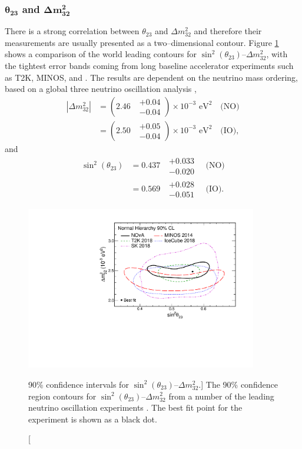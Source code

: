 \subsubsection*{$\boldsymbol{\theta_{23}}$ and $\boldsymbol{\Delta m^2_{32}}$}

There is a strong correlation between $\theta_{23}$ and $\Delta m^2_{32}$ and
therefore their measurements are usually presented as a two--dimensional
contour. Figure \ref{fig:delm_sin23} shows a comparison of the world leading
contours for $\sin^2 (\theta_{23})$--$\Delta m^2_{32}$, with the tightest error
bands coming from long baseline accelerator experiments such as T2K, MINOS, and 
\nova{} \cite{PhysRevD.96.092006, PhysRevLett.112.191801,
PhysRevLett.123.151803}. The results are dependent on the neutrino mass
ordering, based on a global three neutrino oscillation analysis 
\cite{Capozzi:2016rtj}, 
\begin{align*}
	|\Delta m^2_{32}| &= (2.46 \mbox{ } \substack{+ 0.04 \\ - 0.04}) \times 10^{-3} \mbox{  eV}^2 \quad \mbox{(NO)}  \nonumber\\
	                  &= (2.50 \mbox{ } \substack{+ 0.05 \\ - 0.04}) \times 10^{-3} \mbox{  eV}^2 \quad \mbox{(IO)},
\end{align*}
and 
\begin{align*}
	\sin^2(\theta_{23}) &= 0.437 \mbox{  } \substack{+ 0.033 \\ - 0.020} \quad \mbox{(NO)} \nonumber \\
	                    &= 0.569 \mbox{  } \substack{+ 0.028 \\ - 0.051} \quad \mbox{(IO)}.
\end{align*}

\begin{figure}
	\centering
	\includegraphics[width=0.9\textwidth]{figures/theta23_msquare.pdf}
	\caption 
	[90\% confidence intervals for $\sin^2 (\theta_{23})$--$\Delta m^2_{32}$.]
	{The 90\% confidence region contours for 
	$\sin^2 (\theta_{23})$--$\Delta m^2_{32}$ from a number of the leading 
	neutrino oscillation experiments \cite{PhysRevD.96.092006, 
	PhysRevLett.112.191801, PhysRevLett.123.151803}. The best fit point for the
	\nova{} experiment is shown as a black dot. \cite{PhysRevLett.123.151803}}
	\label{fig:delm_sin23}
\end{figure}

